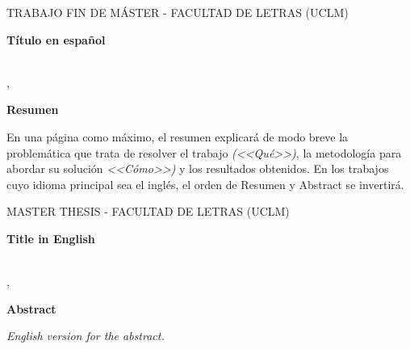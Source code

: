 \pagestyle{plain}	%

%
% 
%

\makeatletter
\begin{center} %
   {\textsc{TRABAJO FIN DE MÁSTER - FACULTAD DE LETRAS (UCLM)}\par} %
   \vspace{1cm} %
   {\textbf{\Large Título en español}\par}  %
   \vspace{0.4cm} %
   {\@autor \\ \@cityTF,{} \@mesTF{} \@yearTF\par} 
   \vspace{0.9cm} %
   {\textbf{\large\textsf{Resumen}}\par} %
\end{center}   
\makeatother %
En una página como máximo, el resumen explicará de modo breve la problemática que trata de resolver el trabajo \emph{(<<Qué>>)}, la metodología para  abordar su solución  \emph{<<Cómo>>)} y los resultados obtenidos. En los trabajos cuyo idioma principal sea el inglés, el orden de \textsf{Resumen} y \textsf{Abstract} se invertirá.



\cleardoublepage %





\makeatletter
\begin{center} %
   {\textsc{MASTER THESIS - FACULTAD DE LETRAS (UCLM)}\par}
   \vspace{1cm} %
   {\textbf{\Large Title in English}\par}
   \vspace{0.4cm} %
   {\@autor \\ \@cityTF,{} \@monthTF{} \@yearTF\par} 
   \vspace{0.9cm} %
   {\textbf{\large\textsf{Abstract}}\par} 
\end{center}   
\makeatother %
\emph{English version for the abstract.}
\cleardoublepage %

